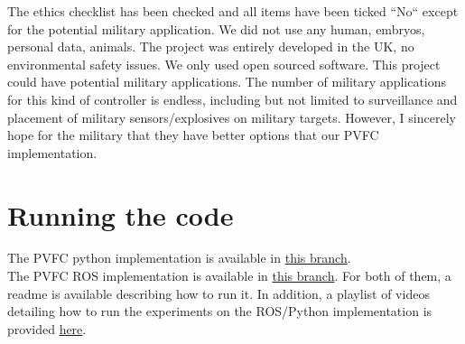 The ethics checklist has been checked and all items have been ticked ``No`` except for the potential military application.
We did not use any human, embryos, personal data, animals. The project was entirely developed in the UK, no environmental safety issues.
We only used open sourced software.
This project could have potential military applications. The number of military applications for this kind of controller is endless, including but not limited to surveillance and placement of military sensors/explosives on military targets. However, I sincerely hope for the military that they have better options that our PVFC implementation.

\section{Running the code}
The PVFC python implementation is available in \href{https://github.com/bsbretly/pvfc_sim/tree/devel-beta_error}{this branch}.\\
The PVFC ROS implementation is available in \href{https://github.com/bsbretly/pvfc_ws/tree/jonas-pcl}{this branch}.
For both of them, a readme is available describing how to run it. 
In addition, a playlist of videos detailing how to run the experiments on the ROS/Python implementation is provided \href{https://www.youtube.com/watch?v=tSBsaKx5Zww&list=PLvZGCthLI9WrbS7W-F28ljQfRyHxxw-9p}{here}.